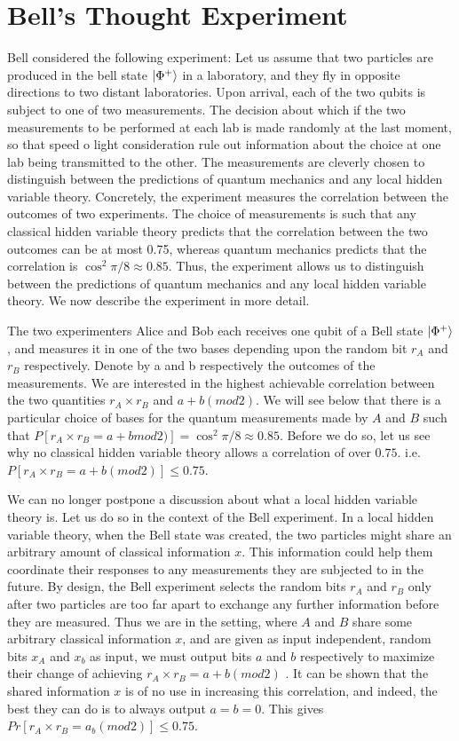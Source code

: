 \section{Bell's Thought Experiment}
Bell considered the following experiment: Let us assume that two particles are produced in the bell state $\ket{\Phi^{+}}$ in a laboratory, and they fly in opposite directions to two distant laboratories. Upon arrival, each of the two qubits is subject to one of two measurements. The decision about which if the two measurements to be performed at each lab is made randomly at the last moment, so that speed o light consideration rule out information about the choice at one lab being transmitted to the other. The measurements are cleverly chosen to distinguish between the predictions of quantum mechanics and any local hidden variable theory. Concretely, the experiment measures the correlation between the outcomes of two experiments. The choice of measurements is such that any classical hidden variable theory predicts that the correlation between the two outcomes can be at most 0.75, whereas quantum mechanics predicts that the correlation is $\cos^2 \pi/8 \approx 0.85$. Thus, the experiment allows us to distinguish between the predictions of quantum mechanics and any local hidden variable theory. We now describe the experiment in more detail. 

The two experimenters Alice and Bob each receives one qubit of a Bell state $\ket{\Phi^{+}}$, and measures it in one of the two bases depending upon the random bit $r_A$ and $r_B$ respectively. Denote by a and b respectively the outcomes of the measurements. We are interested in the highest achievable correlation between the two quantities $r_A \times r_B$ and $a+b(mod 2)$. We will see below that there is a particular choice of bases for the quantum measurements made by $A$ and $B$ such that $P[r_A\times r_B=a+bmod2)]=\cos^2 \pi/8 \approx 0.85$. Before we do so, let us see why no classical hidden variable theory allows a correlation of over $0.75$. i.e. $P[r_A \times r_B = a+b(mod2)]\leq 0.75$. 

We can no longer postpone a discussion about what a local hidden variable theory is. Let us do so in the context of the Bell experiment. In a local hidden variable theory, when the Bell state was created, the two particles might share an arbitrary amount of classical information $x$. This information could help them coordinate their responses to any measurements they are subjected to in the future. By design, the Bell experiment selects the random bits $r_A$ and $r_B$ only after two particles are too far apart to exchange any further information before they are measured. Thus we are in the setting, where $A$ and $B$ share some arbitrary classical information $x$, and are given as input independent, random bits $x_A$ and $x_b$ as input, we must output bits $a$ and $b$ respectively to maximize their change of achieving $r_A \times r_B = a+b(mod2)$ . It can be shown that the shared information $x$ is of no use in increasing this correlation, and indeed, the best they can do is to always output $a=b=0$. This gives $Pr[r_A \times r_B =a_b(mod2)]\leq 0.75$.

